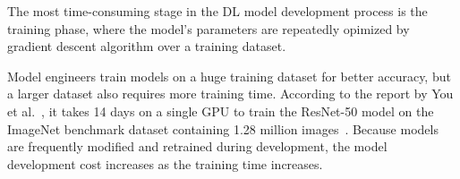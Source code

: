 
\begin{inred}
The most time-consuming stage in the DL model development process is the
training phase, where the model's parameters are repeatedly opimized
by gradient descent algorithm over a training dataset.
\end{inred}
Model engineers train models on a huge training dataset for better accuracy,
but a larger dataset also requires more training time.
According to the report by You et al.~\cite{imagenettraining2017}, it takes 14
days on a single GPU to train the ResNet-50 model on the ImageNet benchmark
dataset containing 1.28 million images~\cite{imagenet2014}.
Because models are frequently modified and retrained during development, the
model development cost increases as the training time increases.

